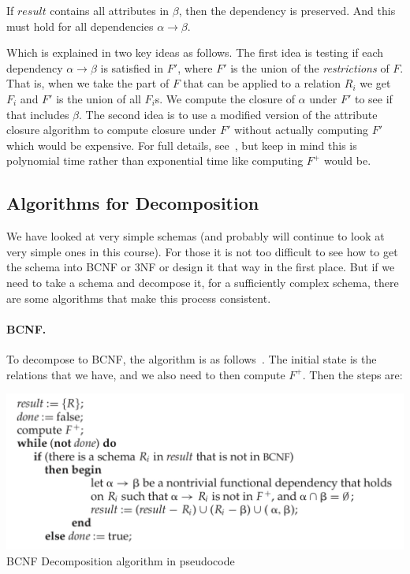 If $result$ contains all attributes in $\beta$, then the dependency is preserved. And this must hold for all dependencies $\alpha \rightarrow \beta$.

Which is explained in two key ideas as follows. The first idea is testing if each dependency $\alpha \rightarrow \beta$ is satisfied in $F'$, where $F'$ is the union of the \textit{restrictions} of $F$. That is, when we take the part of $F$ that can be applied to a relation $R_{i}$ we get $F_{i}$ and $F'$ is the union of all $F_{i}$s. We compute the closure of $\alpha$ under $F'$ to see if that includes $\beta$. The second idea is to use a modified version of the attribute closure algorithm to compute closure under $F'$ without actually computing $F'$ which would be expensive. For full details, see~\cite{dsc}, but keep in mind this is polynomial time rather than exponential time like computing $F^{+}$ would be.

\subsection*{Algorithms for Decomposition}

We have looked at very simple schemas (and probably will continue to look at very simple ones in this course). For those it is not too difficult to see how to get the schema into BCNF or 3NF or design it that way in the first place. But if we need to take a schema and decompose it, for a sufficiently complex schema, there are some algorithms that make this process consistent.

\paragraph{BCNF.}To decompose to BCNF, the algorithm is as follows~\cite{dsc}. The initial state is the relations that we have, and we also need to then compute $F^{+}$. Then the steps are:

\begin{center}
\includegraphics[width=0.7 \textwidth]{images/bcnf-algorithm}\\
BCNF Decomposition algorithm in pseudocode~\cite{dsc}
\end{center}


